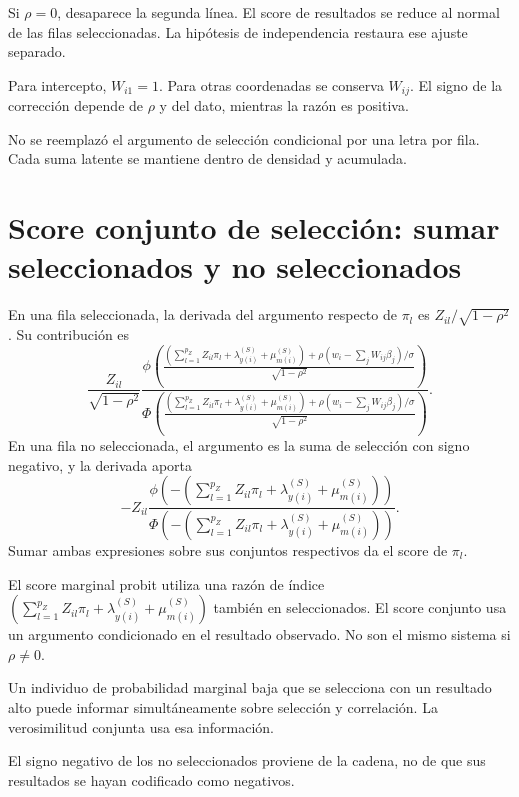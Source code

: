 \documentclass[11pt,a4paper]{article}
\begin{document}
\begin{ejemplo}
Si \(\rho=0\), desaparece
la segunda línea.
El score de resultados
se reduce al normal
de las filas seleccionadas.
La hipótesis de independencia
restaura ese ajuste separado.
\end{ejemplo}
Para intercepto, \(W_{i1}=1\).
Para otras coordenadas
se conserva \(W_{ij}\).
El signo de la
corrección depende de \(\rho\)
y del dato,
mientras la razón
es positiva.

No se reemplazó el argumento
de selección condicional
por una letra por fila.
Cada suma latente se
mantiene dentro de
densidad y acumulada.


\clearpage
\section{Score conjunto de selección: sumar seleccionados y no seleccionados}

En una fila seleccionada,
la derivada del argumento
respecto de \(\pi_l\) es
\(Z_{il}/\sqrt{1-\rho^2}\).
Su contribución es
\[
\frac{Z_{il}}{\sqrt{1-\rho^2}}
\frac{
\phi\left(\frac{\left(\sum_{l=1}^{p_Z}Z_{il}\pi_l+\lambda_{y(i)}^{(S)}+\mu_{m(i)}^{(S)}\right)+
\rho(w_i-\sum_jW_{ij}\beta_j)/\sigma}{\sqrt{1-\rho^2}}\right)}
{\Phi\left(\frac{\left(\sum_{l=1}^{p_Z}Z_{il}\pi_l+\lambda_{y(i)}^{(S)}+\mu_{m(i)}^{(S)}\right)+
\rho(w_i-\sum_jW_{ij}\beta_j)/\sigma}{\sqrt{1-\rho^2}}\right)}.
\]
En una fila no seleccionada,
el argumento es la suma
de selección con signo negativo,
y la derivada aporta
\[
-Z_{il}
\frac{\phi(-\left(\sum_{l=1}^{p_Z}Z_{il}\pi_l+\lambda_{y(i)}^{(S)}+\mu_{m(i)}^{(S)}\right))}
{\Phi(-\left(\sum_{l=1}^{p_Z}Z_{il}\pi_l+\lambda_{y(i)}^{(S)}+\mu_{m(i)}^{(S)}\right))}.
\]
Sumar ambas expresiones sobre
sus conjuntos respectivos
da el score de \(\pi_l\).

El score marginal probit
utiliza una razón de
índice \(\left(\sum_{l=1}^{p_Z}Z_{il}\pi_l+\lambda_{y(i)}^{(S)}+\mu_{m(i)}^{(S)}\right)\)
también en seleccionados.
El score conjunto usa
un argumento condicionado
en el resultado observado.
No son el mismo sistema
si \(\rho\ne0\).

\begin{ejemplo}
Un individuo de probabilidad
marginal baja que se
selecciona con un resultado
alto puede informar
simultáneamente sobre selección
y correlación.
La verosimilitud conjunta
usa esa información.
\end{ejemplo}
El signo negativo de
los no seleccionados
proviene de la cadena,
no de que sus
resultados se hayan
codificado como negativos.
\end{document}
